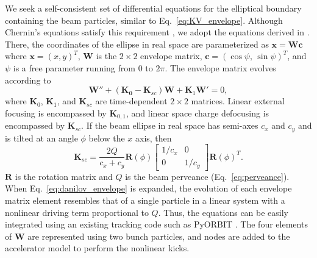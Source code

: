 We seek a self-consistent set of differential equations for the elliptical boundary containing the beam particles, similar to Eq.~\eqref{eq:KV_envelope}. Although Chernin's equations satisfy this requirement \cite{Chernin1988}, we adopt the equations derived in \cite{Danilov2003}. There, the coordinates of the ellipse in real space are parameterized as $\mathbf{x} = \mathbf{W}\mathbf{c}$ where $\mathbf{x} = (x, y)^T$, $\mathbf{W}$ is the $2 \times 2$ envelope matrix, $\mathbf{c} = (\cos\psi, \, \sin\psi)^T$, and $\psi$ is a free parameter running from $0$ to $2\pi$. The envelope matrix evolves according to
%
\begin{equation}\label{eq:danilov_envelope}
    \mathbf{W}'' + \left({\mathbf{K_0} - \mathbf{K}_{sc}}\right)\mathbf{W} + \mathbf{K}_1 \mathbf{W}'= 0,
\end{equation}
%
where $\mathbf{K}_0$, $\mathbf{K}_1$, and $\mathbf{K}_{sc}$ are time-dependent $2 \times 2$ matrices. Linear external focusing is encompassed by $\mathbf{K}_{0, 1}$, and linear space charge defocusing is encompassed by $\mathbf{K}_{sc}$. If the beam ellipse in real space has semi-axes $c_x$ and $c_y$ and is tilted at an angle $\phi$ below the $x$ axis, then
%
\begin{equation}
    \mathbf{K}_{sc} = \frac{2Q}{c_x + c_y} 
        \mathbf{R}(\phi) \begin{bmatrix} 1/c_x & 0 \\ 0 & 1/c_y \end{bmatrix} \mathbf{R}(\phi)^T. 
\end{equation}
%
$\mathbf{R}$ is the rotation matrix and $Q$ is the beam perveance (Eq.~\eqref{eq:perveance}). When Eq.~\eqref{eq:danilov_envelope} is expanded, the evolution of each envelope matrix element resembles that of a single particle in a linear system with a nonlinear driving term proportional to $Q$. Thus, the equations can be easily integrated using an existing tracking code such as PyORBIT \cite{Shishlo2015}. The four elements of $\mathbf{W}$ are represented using two bunch particles, and nodes are added to the accelerator model to perform the nonlinear kicks. 

